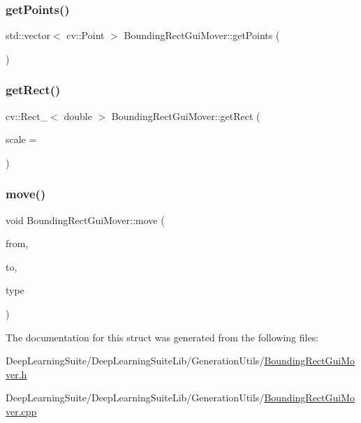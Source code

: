 \subsubsection{\texorpdfstring{get\+Points()}{getPoints()}}
{\footnotesize\ttfamily std\+::vector$<$ cv\+::\+Point $>$ Bounding\+Rect\+Gui\+Mover\+::get\+Points (\begin{DoxyParamCaption}{ }\end{DoxyParamCaption})}

\mbox{\label{struct_bounding_rect_gui_mover_a5e242d1bbc84714da0fa04b0adee0e5d}} 
\subsubsection{\texorpdfstring{get\+Rect()}{getRect()}}
{\footnotesize\ttfamily cv\+::\+Rect\+\_\+$<$ double $>$ Bounding\+Rect\+Gui\+Mover\+::get\+Rect (\begin{DoxyParamCaption}\item[{const double}]{scale = {} }\end{DoxyParamCaption})}

\mbox{\label{struct_bounding_rect_gui_mover_a86c01942e7a57a0cec7d757592b40c41}} 
\subsubsection{\texorpdfstring{move()}{move()}}
{\footnotesize\ttfamily void Bounding\+Rect\+Gui\+Mover\+::move (\begin{DoxyParamCaption}\item[{const cv\+::\+Point \&}]{from,  }\item[{const cv\+::\+Point \&}]{to,  }\item[{const \hyperlink{struct_bounding_rect_gui_mover_a76ac02999d4012d5a8ba60853d2c6493}{Movement\+Type} \&}]{type }\end{DoxyParamCaption})}



The documentation for this struct was generated from the following files\+:\begin{DoxyCompactItemize}
\item 
Deep\+Learning\+Suite/\+Deep\+Learning\+Suite\+Lib/\+Generation\+Utils/\hyperlink{_bounding_rect_gui_mover_8h}{Bounding\+Rect\+Gui\+Mover.\+h}\item 
Deep\+Learning\+Suite/\+Deep\+Learning\+Suite\+Lib/\+Generation\+Utils/\hyperlink{_bounding_rect_gui_mover_8cpp}{Bounding\+Rect\+Gui\+Mover.\+cpp}\end{DoxyCompactItemize}
